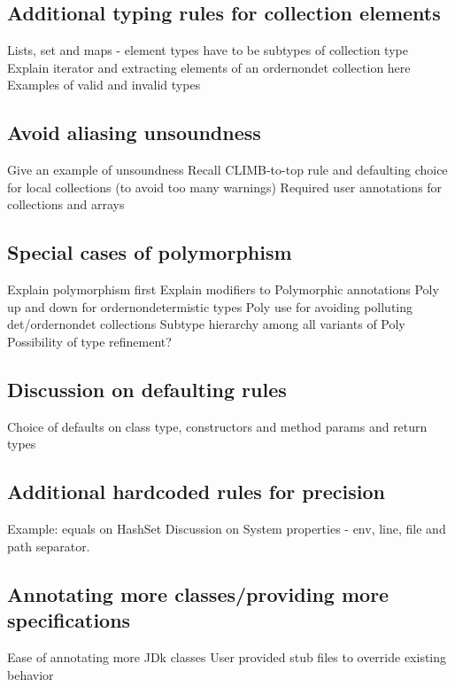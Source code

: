 \subsection{Additional typing rules for collection elements}
Lists, set and maps - element types have to be subtypes of collection type 
Explain iterator and extracting elements of an ordernondet collection here
Examples of valid and invalid types

\subsection{Avoid aliasing unsoundness}
Give an example of unsoundness 
Recall CLIMB-to-top rule and defaulting choice for local collections (to avoid too many warnings)
Required user annotations for collections and arrays

\subsection{Special cases of polymorphism}
Explain polymorphism first
Explain modifiers to Polymorphic annotations
Poly up and down for ordernondetermistic types
Poly use for avoiding polluting det/ordernondet collections
Subtype hierarchy among all variants of Poly
Possibility of type refinement?	

\subsection{Discussion on defaulting rules}
Choice of defaults on class type, constructors and method params and return types

\subsection{Additional hardcoded rules for precision}
Example: equals on HashSet
Discussion on System properties - env, line, file and path separator.

\subsection{Annotating more classes/providing more specifications}
Ease of annotating more JDk classes
User provided stub files to override existing behavior
